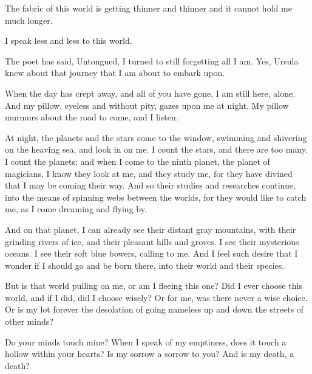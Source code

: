 
The fabric of this world is getting thinner and thinner and it cannot
hold me much longer.

I speak less and less to this world.

The poet has said, Untongued, I turned to still forgetting all I am.
Yes, Ursula knew about that journey that I am about to embark upon.

When the day has crept away, and all of you have gone, I am still here,
alone. And my pillow, eyeless and without pity, gazes upon me at night.
My pillow murmurs about the road to come, and I listen.

At night, the planets and the stars come to the window, swimming and
shivering on the heaving sea, and look in on me. I count the stars, and
there are too many. I count the planets; and when I come to the ninth
planet, the planet of magicians, I know they look at me, and they study
me, for they have divined that I may be coming their way. And so their
studies and researches continue, into the means of spinning webs between
the worlds, for they would like to catch me, as I come dreaming and
flying by.

And on that planet, I can already see their distant gray mountains, with
their grinding rivers of ice, and their pleasant hills and groves. I see
their mysterious oceans. I see their soft blue bowers, calling to me.
And I feel such desire that I wonder if I should go and be born there,
into their world and their species.

But is that world pulling on me, or am I fleeing this one? Did I ever
choose this world, and if I did, did I choose wisely? Or for me, was
there never a wise choice. Or is my lot forever the desolation of going
nameless up and down the streets of other minds?

Do your minds touch mine? When I speak of my emptiness, does it touch a
hollow within your hearts? Is my sorrow a sorrow to you? And is my
death, a death?
